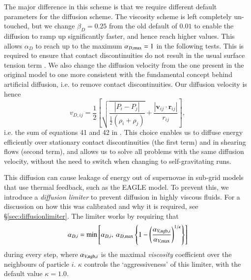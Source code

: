 The major difference in this scheme is that we require different default
parameters for the diffusion scheme. The viscosity scheme is left completely
un-touched, but we change $\beta_D = 0.25$ from the old default of $0.01$ to
enable the diffusion to ramp up significantly faster, and hence reach higher
values. This allows $\alpha_D$ to reach up to the maximum $\alpha_{D, {\rm
max}} = 1$ in the following tests. This is required to ensure that contact
discontinuities do not result in the usual surface tension term \citep[see ][
for more details on this issue with Density-Energy SPH]{Price2008}. We also
change the diffusion velocity from the one present in the original \eagle{}
\anarchy{} model to one more consistent with the fundamental concept behind
artificial diffusion, i.e. to remove contact discontinuities. Our diffusion
velocity is hence
\begin{equation}
    v_{D, ij} = \frac{1}{2}\left[
        \sqrt{\frac{|P_i - P_j|}{\frac{1}{2}\left(\rho_i + \rho_j\right)}} + 
        \frac{|\mathbf{v}_{ij} \cdot \mathbf{r}_{ij}|}{r_{ij}}
    \right],
    \label{eqn:vdiffanarchydu}
\end{equation}
i.e. the sum of equations 41 and 42 in \citep{Price2018}. This choice enables
us to diffuse energy efficiently over stationary contact discontinuities (the
first term) and in shearing flows (second term), and allows us to solve all
problems with the same diffusion velocity, without the need to switch when
changing to self-gravitating runs.

This diffusion can cause leakage of energy out of supernovae in sub-grid
models that use thermal feedback, such as the EAGLE model. To prevent this,
we introduce a \emph{diffusion limiter} to prevent diffusion in highly
viscous fluids. For a discussion on how this was calibrated and why it is
required, see \S \ref{sec:diffusionlimiter}. The limiter works by requiring
that
\begin{equation}
    \alpha_{D, i} = \min\left[
        \alpha_{D, i}, ~ \alpha_{D, {\rm max}}
            \left\{
                1 - \left(\frac{\alpha_{V, {\rm ngb}, i}}{\alpha_{V, {\rm{max}}}}\right)^{1/\kappa}
            \right\}
        \right]
    \label{eqn:diffusionlimiter}
\end{equation}
during every step, where $\alpha_{V, {\rm ngb}, i}$ is the maximal
\emph{viscosity} coefficient over the neighbours of particle $i$. $\kappa$
controls the `aggressiveness' of this limiter, with the default value $\kappa
= 1.0$.